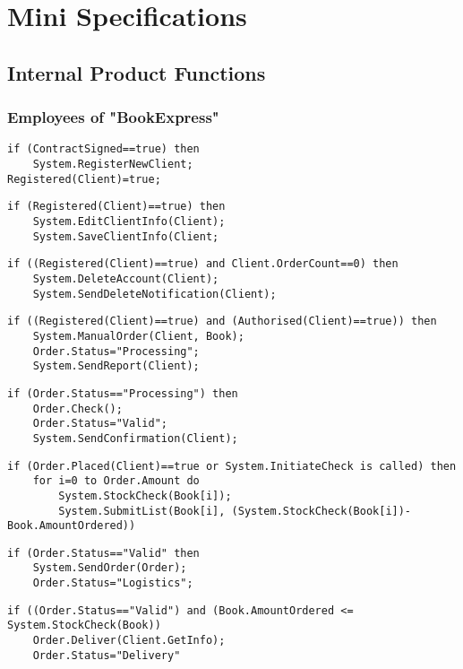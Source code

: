 \documentclass[12pt,a4paper]{article}
\begin{document}
\section{Mini Specifications}
\subsection{Internal Product Functions}
\subsubsection{Employees of "BookExpress"}
\begin{lstlisting}[caption=/PF00/Register Publisher or Book shop (client)]
if (ContractSigned==true) then  
	System.RegisterNewClient;
Registered(Client)=true;
\end{lstlisting}
\begin{lstlisting}[caption=/PF01/Edit client information]
if (Registered(Client)==true) then  
	System.EditClientInfo(Client);
	System.SaveClientInfo(Client;
\end{lstlisting}
\begin{lstlisting}[caption=/PF02/Delete Account]
if ((Registered(Client)==true) and Client.OrderCount==0) then  
	System.DeleteAccount(Client);
	System.SendDeleteNotification(Client);
\end{lstlisting}
\begin{lstlisting}[caption=/PF10/ Client places Order]
if ((Registered(Client)==true) and (Authorised(Client)==true)) then  
	System.ManualOrder(Client, Book);
	Order.Status="Processing";
	System.SendReport(Client);
\end{lstlisting}
\begin{lstlisting}[caption=/PF11/ Validate Order]
if (Order.Status=="Processing") then 
	Order.Check();
	Order.Status="Valid";
	System.SendConfirmation(Client);
\end{lstlisting}
\begin{lstlisting}[caption=/PF12/ Stock Update]
if (Order.Placed(Client)==true or System.InitiateCheck is called) then
	for i=0 to Order.Amount do
		System.StockCheck(Book[i]);
		System.SubmitList(Book[i], (System.StockCheck(Book[i])-Book.AmountOrdered))
\end{lstlisting}
\begin{lstlisting}[caption=/PF13/ Forward Order to Logistics]
if (Order.Status=="Valid" then
	System.SendOrder(Order);
	Order.Status="Logistics";
\end{lstlisting}
\begin{lstlisting}[caption=/PF14/ Deliver Order]
if ((Order.Status=="Valid") and (Book.AmountOrdered <= System.StockCheck(Book))
	Order.Deliver(Client.GetInfo);
	Order.Status="Delivery"
\end{lstlisting}
\end{document}
